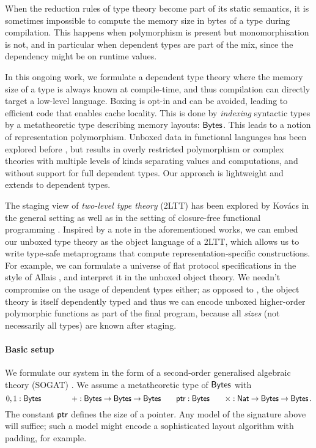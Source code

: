 When the reduction rules of type theory become part of its static semantics, it
is sometimes impossible to compute the memory size in bytes of a type during compilation.
This happens when polymorphism is present but monomorphisation is not, and in
particular when dependent types are part of the mix, since the dependency might
be on runtime values.

In this ongoing work, we formulate a dependent type theory where the memory size
of a type is always known at compile-time, and thus compilation can directly
target a low-level language. Boxing is opt-in and
can be avoided, leading to efficient code that enables cache locality. This is
done by \emph{indexing} syntactic types by a metatheoretic type describing
memory layouts: $\textsf{Bytes}$. This leads to a notion of representation polymorphism.
Unboxed data in functional languages has been explored before
\cite{Jones1991-ik,Eisenberg2017-pq,Downen2024-nk}, but results in overly restricted polymorphism
or complex theories with multiple levels of kinds separating values and
computations, and without support for full dependent types. Our approach is
lightweight and extends to dependent types.

The staging view of \emph{two-level type theory} (2LTT) \cite{Annenkov2023-vk}
has been explored by Kov\'acs in the general setting \cite{Kovacs2022-rf} as
well as in the setting of closure-free functional programming
\cite{Kovacs2024-hn}. Inspired by a note in the aforementioned works, we can embed
our unboxed type theory as the object language of a 2LTT, which allows us to
write type-safe metaprograms that compute representation-specific constructions.
For example, we can formulate a universe of flat protocol specifications in the
style of Allais \cite{Allais2023-zq}, and interpret it in the unboxed object
theory.
We needn't compromise on the usage of dependent types either; as opposed to
\cite{Kovacs2024-hn}, the object theory is itself dependently typed and thus we
can encode unboxed higher-order polymorphic functions as part of the final
program, because all \emph{sizes} (not necessarily all types) are known after staging.

\paragraph{Basic setup}
We formulate our system in the form of a second-order generalised
algebraic theory (SOGAT) \cite{Uemura2021-jq}.
We assume a metatheoretic type of
\(\textsf{Bytes}\) with
\[
	0, 1 : \textsf{Bytes} \qquad \qquad + : \textsf{Bytes} \to \textsf{Bytes} \to \textsf{Bytes} \qquad \textsf{ptr} : \textsf{Bytes} \qquad \times : \textsf{Nat} \to \textsf{Bytes} \to \textsf{Bytes} \,.
\]
The constant \(\textsf{ptr}\) defines the size of a pointer. Any model of
the signature above will suffice; such a model might encode a sophisticated
layout algorithm with padding, for example.

